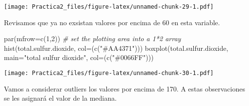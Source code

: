 \documentclass[
]{article}
\newenvironment{Shaded}{\begin{snugshade}}{\end{snugshade}}
\newcommand{\AttributeTok}[1]{\textcolor[rgb]{0.77,0.63,0.00}{#1}}
\newcommand{\CommentTok}[1]{\textcolor[rgb]{0.56,0.35,0.01}{\textit{#1}}}
\newcommand{\ConstantTok}[1]{\textcolor[rgb]{0.00,0.00,0.00}{#1}}
\newcommand{\DecValTok}[1]{\textcolor[rgb]{0.00,0.00,0.81}{#1}}
\newcommand{\FunctionTok}[1]{\textcolor[rgb]{0.00,0.00,0.00}{#1}}
\newcommand{\NormalTok}[1]{#1}
\newcommand{\OtherTok}[1]{\textcolor[rgb]{0.56,0.35,0.01}{#1}}
\newcommand{\SpecialCharTok}[1]{\textcolor[rgb]{0.00,0.00,0.00}{#1}}
\newcommand{\StringTok}[1]{\textcolor[rgb]{0.31,0.60,0.02}{#1}}
\begin{document}
\begin{Shaded}
\end{Shaded}

\texttt{[image: Practica2\_files/figure-latex/unnamed-chunk-29-1.pdf]}

Revisamos que ya no exsistan valores por encima de 60 en esta variable.

\begin{Shaded}
\begin{Highlighting}[]
\FunctionTok{par}\NormalTok{(}\AttributeTok{mfrow=}\FunctionTok{c}\NormalTok{(}\DecValTok{1}\NormalTok{,}\DecValTok{2}\NormalTok{))    }\CommentTok{\# set the plotting area into a 1*2 array}
\FunctionTok{hist}\NormalTok{(total.sulfur.dioxide, }\AttributeTok{col=}\NormalTok{(}\FunctionTok{c}\NormalTok{(}\StringTok{"\#AA4371"}\NormalTok{)))}
\FunctionTok{boxplot}\NormalTok{(total.sulfur.dioxide, }\AttributeTok{main=}\StringTok{"total sulfur dioxide"}\NormalTok{, }\AttributeTok{col=}\NormalTok{(}\FunctionTok{c}\NormalTok{(}\StringTok{"\#0066FF"}\NormalTok{)))}
\end{Highlighting}
\end{Shaded}

\texttt{[image: Practica2\_files/figure-latex/unnamed-chunk-30-1.pdf]}

Vamos a considerar outliers los valores por encima de 170. A estas
observaciones se les asignará el valor de la mediana.

\begin{Shaded}
\end{Shaded}
\end{document}
